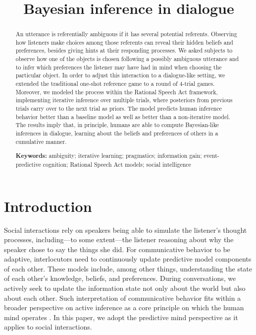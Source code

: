 \documentclass[10pt,a4paper]{article}
\title{Bayesian inference in dialogue}
\begin{document}
\maketitle

\begin{abstract}
	
An utterance is referentially ambiguous if it has several potential referents.
Observing how listeners make choices among those referents can reveal their hidden beliefs and preferences, besides giving hints at their responding processes.
We asked subjects to observe how one of the objects is chosen following a possibly ambiguous utterance and to infer which preferences the listener may have had in mind when choosing the particular object.
In order to adjust this interaction to a dialogue-like setting, we extended the traditional one-shot reference game to a round of 4-trial games.
Moreover, we modeled the process within the Rational Speech Act framework, implementing iterative inference over multiple trials,
where posteriors from previous trials carry over to the next trial as priors. %
The model predicts human inference behavior better than a baseline model as well as better than a non-iterative model. 
The results imply that, in principle, humans are able to compute Bayesian-like inferences in dialogue, learning about the beliefs and preferences of others in a cumulative manner.
                                                     

\textbf{Keywords:} 
ambiguity; iterative learning; pragmatics; information gain; event-predictive cognition; Rational Speech Act models; social intelligence
\end{abstract}


\section{Introduction}

Social interactions rely on speakers being able to simulate the listener's thought processes, including---to some extent---the listener reasoning about why the speaker chose to say the things she did.
For communicative behavior to be adaptive, interlocutors need to continuously update predictive model components of each other.
These models include, among other things, understanding the state of each other's knowledge, beliefs, and preferences.
During conversations, we actively seek to update the information state not only about the world but also about each other.
Such interpretation of communicative behavior fits within a broader perspective on active inference as a core principle on which the human mind operates \cite{Friston:2015b}.
In this paper, we adopt the predictive mind perspective as it applies to social interactions.
\end{document}
